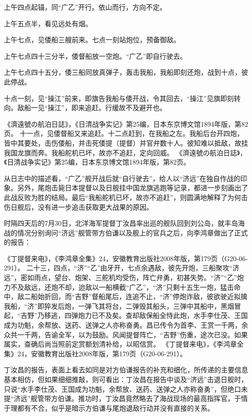 \documentclass[12pt,UTF8]{ctexbook}
\begin{document}
上午四点起锚，同“广乙”开行。依山而行，方向不定。

上午五点半，看见远处有烟。

上午七点，见倭船三艘前来。七点一刻站炮位，预备御敌。

上午七点四十三分半，倭督船放一空炮。“广乙”即自行驶去。

上午七点四十五分，倭三船同放真弹子，轰击我船，我船即刻还炮，战到十点，彼此停战。

十点一刻，见“操江”前来，即旗告我船与倭开战，令其回去，“操江”见旗即刻转向。敌船一见“操江”，即来追赶。行缓故不及避开也。

《濟遠號の航泊日誌》，《日清战争实记》第25编，日本东京博文馆1894年版，第82页。
十一点，见倭督船又来追赶。十二点赶到，在我船之左。我船后台开四炮，皆中其要处，击伤倭船，并击死倭提（提督）并官弁数十人。彼知难以抵敌，故挂我国龙旗而奔。我船舵机已坏，故亦不追赶，定向回威。 《濟遠號の航泊日誌》，《日清战争实记》第25编，日本东京博文馆1894年版，第82页。

从日志中的描述看，“广乙”舰开战后就“自行驶去”，给人以“济远”在独自作战的印象。另外，尾炮击毙日本提督以及日舰挂中国龙旗逃跑等记录，都进一步刻画出了此战反败为胜的结局。最后“我船舵机已坏，故亦不追赶”，则圆满地解释了为何击伤日舰后，没有进一步追击获取更大战果的原因。

时隔四天后的7月30日，北洋海军提督丁汝昌率出巡的舰队回到刘公岛，就丰岛海战的情况分别询问“济远”舰管带方伯谦以及舰上的官兵之后，向李鸿章做出了正式的报告：

《丁提督来电》，《李鸿章全集》24，安徽教育出版社2008年版，第179页（G20-06-291）。
二十三，四点，“济”“乙”由牙开，七点余遇敌，彼先开炮，三船聚攻“济远”，密如雨点，望台、炮架、三舵机均受伤，阵亡弁勇，初甚失势。“济”“乙”炮力不及敌远，还炮不却，迨敌以一船横截“广乙”，“济”只剩十五生一炮，猛击命中，敌二船始折回，而“吉野”督船尾后，连追不止，“济”停炮诈敌，彼欲驶近拟擒我船，“济”即猝发后炮，一弹飞其将台，二弹毁其船头，三弹中其船中，黑烟冒起，“吉野”乃移逃，四弹炮力已不及矣。查却敌保船全恃此炮，水手李仕茂、王国成为功魁，余帮放、送药、送弹之人亦称奋勇。昌已传令为首李、王赏一千两，余众共一千两，告谕全军，以为鼓励。风闻提督阵亡，“吉野”伤重，途次已没。如果属实，查确后尚当照前定赏额划清补给，以昭信赏。 《丁提督来电》，《李鸿章全集》24，安徽教育出版社2008年版，第179页（G20-06-291）。

丁汝昌的报告，表面上看去如同是对方伯谦报告的补充和细化，所传递的主要信息基本相仿，但如果细细推敲，则可看出：丁汝昌在报告中谈及“济远”击退日舰时，只说“水手李仕茂、王国成为功魁，余帮放、送药、送弹之人亦称奋勇”，但绝口未提“济远”舰管带方伯谦。推功时，丁汝昌竟然略去了海战现场的最高指挥官，于情于理都有不合，似乎是暗示方伯谦与尾炮退敌行动并没有直接的关系。
\end{document}
